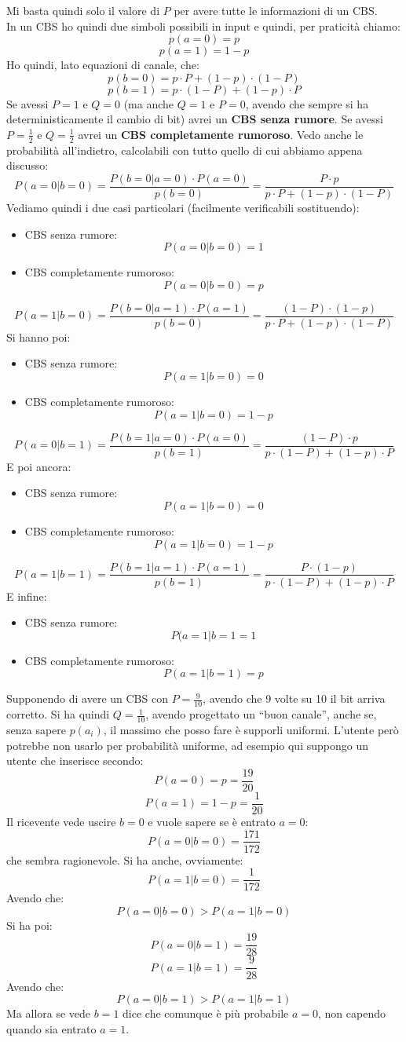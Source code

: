 \documentclass[a4paper,12pt, oneside]{book}
\begin{document}
Mi basta quindi solo il valore di $P$ per avere tutte le informazioni di un
CBS. \\
In un CBS ho quindi due simboli possibili in input e quindi, per praticità
chiamo: 
\[p(a=0)=p\]
\[p(a=1)=1-p\]
Ho quindi, lato equazioni di canale, che:
\[p(b=0)=p\cdot P+(1-p)\cdot (1-P)\]
\[p(b=1)=p\cdot (1-P)+ (1-p)\cdot P\]
Se avessi $P=1$ e $Q=0$ (ma anche $Q=1$ e $P=0$, avendo che sempre si ha
deterministicamente il cambio di bit) avrei un \textbf{CBS senza
  rumore}. Se avessi $P=\frac{1}{2}$ e $Q=\frac{1}{2}$ avrei un \textbf{CBS
  completamente rumoroso}.
Vedo anche le probabilità all'indietro, calcolabili con tutto quello di cui
abbiamo appena discusso:
\[P(a=0|b=0)=\frac{P(b=0|a=0)\cdot P(a=0)}{p(b=0)}=\frac{P\cdot p}{p\cdot
    P+(1-p)\cdot (1-P)}\]
Vediamo quindi i due casi particolari (facilmente verificabili sostituendo):
\begin{itemize}
  \item CBS senza rumore:
  \[P(a=0|b=0)=1\]
  \item CBS completamente rumoroso:
  \[P(a=0|b=0)=p\]
\end{itemize}
\[P(a=1|b=0)=\frac{P(b=0|a=1)\cdot P(a=1)}{p(b=0)}=\frac{(1-P)\cdot
    (1-p)}{p\cdot P+(1-p)\cdot (1-P)}\]
Si hanno poi:
\begin{itemize}
  \item CBS senza rumore:
  \[P(a=1|b=0)=0\]
  \item CBS completamente rumoroso:
  \[P(a=1|b=0)=1-p\]
\end{itemize}
\[P(a=0|b=1)=\frac{P(b=1|a=0)\cdot P(a=0)}{p(b=1)}=\frac{(1-P)\cdot p}{p\cdot
    (1-P)+ (1-p)\cdot P}\]  
E poi ancora:
\begin{itemize}
  \item CBS senza rumore:
  \[P(a=1|b=0)=0\]
  \item CBS completamente rumoroso:
  \[P(a=1|b=0)=1-p\]
\end{itemize}
\[P(a=1|b=1)=\frac{P(b=1|a=1)\cdot P(a=1)}{p(b=1)}=\frac{P\cdot
    (1-p)}{p\cdot (1-P)+ (1-p)\cdot P}\]
E infine:
\begin{itemize}
  \item CBS senza rumore:
  \[P(a=1|b=1=1\]
  \item CBS completamente rumoroso:
  \[P(a=1|b=1)=p\]
\end{itemize}
\begin{esempio}
  Supponendo di avere un CBS con $P=\frac{9}{10}$, avendo che 9 volte su 10 il
  bit 
  arriva corretto. Si ha quindi $Q=\frac{1}{10}$, avendo progettato un ``buon
  canale'', anche se, senza sapere $p(a_i)$, il massimo che posso fare è
  supporli 
  uniformi. L'utente però potrebbe non usarlo per probabilità uniforme, ad
  esempio 
  qui suppongo un utente che inserisce secondo:
  \[P(a=0)=p=\frac{19}{20}\]
  \[P(a=1)=1-p=\frac{1}{20}\]
  Il ricevente vede uscire $b=0$ e vuole sapere se è entrato $a=0$:
  \[P(a=0|b=0)=\frac{171}{172}\]
  che sembra ragionevole. Si ha anche, ovviamente:
  \[P(a=1|b=0)=\frac{1}{172}\]
  Avendo che:
  \[P(a=0|b=0)>P(a=1|b=0)\]
  Si ha poi:
  \[P(a=0|b=1)=\frac{19}{28}\]
  \[P(a=1|b=1)=\frac{9}{28}\]
  Avendo che:
  \[P(a=0|b=1)>P(a=1|b=1)\]
  Ma allora se vede $b=1$ dice che comunque è più probabile $a=0$, non capendo
  quando sia entrato $a=1$.
\end{esempio}
\end{document}
